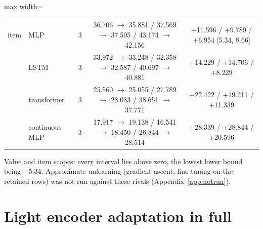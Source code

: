 \documentclass{article} %
\begin{document}
\begin{table}[h]
\begin{adjustbox}{max width=\linewidth}
\begin{tabular}{llccc}
item & MLP & 3 & 36.706 $\to$ 35.881 / 37.569 $\to$ 37.505 / 43.174 $\to$ 42.156 & +11.596 / +9.789 / +6.954 [5.34, 8.66] \\
 & LSTM & 3 & 33.972 $\to$ 33.248 / 32.358 $\to$ 32.587 / 40.697 $\to$ 40.881 & +14.229 / +14.706 / +8.229 \\
 & transformer & 3 & 25.560 $\to$ 25.055 / 27.789 $\to$ 28.083 / 38.651 $\to$ 37.771 & +22.422 / +19.211 / +11.339 \\
 & continuous MLP & 3 & 17.917 $\to$ 19.138 / 16.541 $\to$ 18.450 / 26.844 $\to$ 28.514 & +28.339 / +28.844 / +20.596 \\
\bottomrule
\end{tabular}\end{adjustbox}
\end{table}

\noindent Value and item scopes: every interval lies above zero, the lowest lower bound being %
+5.34. Approximate unlearning (gradient ascent, fine-tuning on the retained rows) was not run %
against these rivals (Appendix~\ref{app:notrun}).
\section{Light encoder adaptation in full}
\label{app:adapt}
\end{document}
